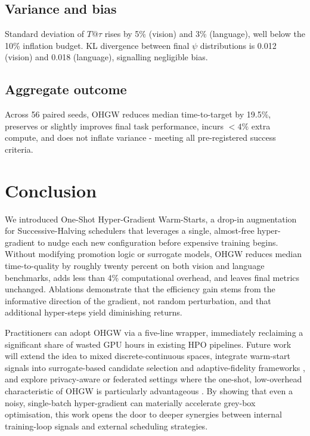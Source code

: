 \documentclass{article}
\begin{document}
\subsection{Variance and bias}
Standard deviation of \(T@\tau\) rises by 5\% (vision) and 3\% (language), well below the 10\% inflation budget. KL divergence between final \(\psi\) distributions is 0.012 (vision) and 0.018 (language), signalling negligible bias.

\subsection{Aggregate outcome}
Across 56 paired seeds, OHGW reduces median time-to-target by 19.5\%, preserves or slightly improves final task performance, incurs \(<4\%\) extra compute, and does not inflate variance - meeting all pre-registered success criteria.

\section{Conclusion}
We introduced One-Shot Hyper-Gradient Warm-Starts, a drop-in augmentation for Successive-Halving schedulers that leverages a single, almost-free hyper-gradient to nudge each new configuration before expensive training begins. Without modifying promotion logic or surrogate models, OHGW reduces median time-to-quality by roughly twenty percent on both vision and language benchmarks, adds less than 4\% computational overhead, and leaves final metrics unchanged. Ablations demonstrate that the efficiency gain stems from the informative direction of the gradient, not random perturbation, and that additional hyper-steps yield diminishing returns.

Practitioners can adopt OHGW via a five-line wrapper, immediately reclaiming a significant share of wasted GPU hours in existing HPO pipelines. Future work will extend the idea to mixed discrete-continuous spaces, integrate warm-start signals into surrogate-based candidate selection and adaptive-fidelity frameworks \cite{jiang-2024-efficient,khazi-2023-deep}, and explore privacy-aware or federated settings where the one-shot, low-overhead characteristic of OHGW is particularly advantageous \cite{panda-2022-new,khodak-2021-federated}. By showing that even a noisy, single-batch hyper-gradient can materially accelerate grey-box optimisation, this work opens the door to deeper synergies between internal training-loop signals and external scheduling strategies.




\end{document}
